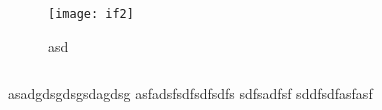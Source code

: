 \begin{figure}[h!]
	\begin{minipage}[b]{0.65\linewidth}
		\centering
		\texttt{[image: if2]}
		\caption{asd}
		\label{fig:ifImage2}
	\end{minipage}
	\hspace{0.5cm}
	\begin{minipage}[b]{0.25\linewidth}
		\centering
		\inputminted{haskell}{codes/ifCode2.hs}
		\caption{}
		\label{fig:ifCode2}
	\end{minipage}
\end{figure}

asadgdsgdsgsdagdsg asfadsfsdfsdfsdfs
sdfsadfsf
\cite{hughes}
\cite{swierstra}
\cite{olaf}
\cite{wadler}
\cite{peytonJones}
\cite{ocamlFormat}
sddfsdfasfasf